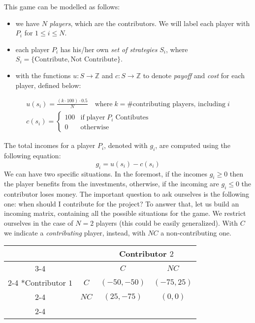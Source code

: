 \documentclass{article}
\begin{document}
This game can be modelled as follows:
\begin{itemize}
    \item we have $N$ \textit{players}, which are the contributors. We will label each player with $P_i$ for $1 \le i \le N$.
    \item each player $P_i$ has his/her own \textit{set of strategies} $S_i$, where $S_i = \{\textrm{Contribute}, \textrm{Not Contribute}\}$.
    \item with the functions $u: S \to \mathbb{Z}$ and $c: S \to \mathbb{Z}$ to denote \textit{payoff} and \textit{cost} for each player, defined below:
\end{itemize}

\begin{gather*}
    u(s_i) = \frac{(k \cdot 100) \cdot 0.5}{N} \quad \textrm{where} \; k = \#\textrm{contributing players, including} \; i \\
    c(s_i) = \begin{cases}
        100 & \textrm{if} \; \textrm{player} \; P_i \; \textrm{Contibutes} \\
        0 & \textrm{otherwise}
    \end{cases}
\end{gather*}

\noindent The total incomes for a player $P_i$, denoted with $g_i$, are computed using the following equation:
\begin{equation*}
    g_i = u(s_i) - c(s_i)
\end{equation*}
We can have two specific situations. In the foremost, if the incomes $g_i \ge 0$ then the player benefits from the investments, otherwise, if the incoming
are $g_i \le 0$ the contributor loses money. The important question to ask ourselves is the following one: when should I contribute for the project?
To answer that, let us build an incoming matrix, containing all the possible situations for the game. We restrict ourselves in the case of $N=2$ players (this could be easily generalized).
With $C$ we indicate a \textit{contributing} player, instead, with $NC$ a non-contributing one.

\begin{table}[h!]
    \centering
    \setlength{\extrarowheight}{2pt}
    \begin{tabular}{*{4}{c|}}
      \multicolumn{2}{c}{} & \multicolumn{2}{c}{Contributor $2$}\\\cline{3-4}
      \multicolumn{1}{c}{} &  & $C$  & $NC$ \\\cline{2-4}
      \multirow{2}*{Contributor $1$}  & $C$ & $(-50,-50)$ & $(-75,25)$ \\\cline{2-4}
      & $NC$ & $(25,-75)$ & $(0,0)$ \\\cline{2-4}
    \end{tabular}
    \label{Incoming table for $N=2$ players.}
\end{table}
\end{document}
